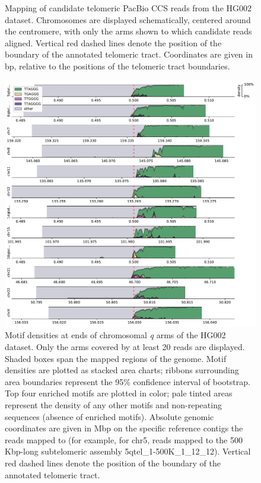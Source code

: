 \documentclass{article}
\begin{document}
\begin{figure}[h!]
\caption{
    Mapping of candidate telomeric PacBio CCS reads from the HG002 dataset.
    Chromosomes are displayed schematically, centered around the centromere, with only the arms shown to which candidate reads aligned.
    Vertical red dashed lines denote the position of the boundary of the annotated telomeric tract.
    Coordinates are given in bp, relative to the positions of the telomeric tract boundaries.
}
\label{fig:hg002_alignment}
\end{figure}
\clearpage \pagebreak

\begin{figure}[h!] \centering
\includegraphics[height=\textheight,width=\textwidth,keepaspectratio]{figures/HG002-densityplot-q_arm.pdf}
\caption{
    Motif densities at ends of chromosomal \textit{q} arms of the HG002 dataset.
    Only the arms covered by at least 20 reads are displayed.
    Shaded boxes span the mapped regions of the genome.
    Motif densities are plotted as stacked area charts; ribbons surrounding area boundaries represent the 95\% confidence interval of bootstrap.
    Top four enriched motifs are plotted in color; pale tinted areas represent the density of any other motifs and non-repeating sequences (absence of enriched motifs).
    Absolute genomic coordinates are given in Mbp on the specific reference contigs the reads mapped to (for example, for chr5, reads mapped to the 500 Kbp-long subtelomeric assembly \mbox{5qtel\_1-500K\_1\_12\_12}).
    Vertical red dashed lines denote the position of the boundary of the annotated telomeric tract.
}
\label{fig:hg002_densityplot_q_arm}
\end{figure}
\clearpage \pagebreak
\end{document}
